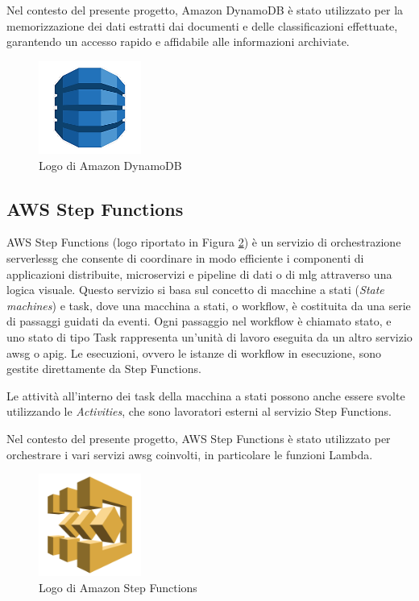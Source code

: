 Nel contesto del presente progetto, Amazon DynamoDB è stato utilizzato per la memorizzazione dei dati estratti dai documenti e delle classificazioni effettuate, garantendo un accesso rapido e affidabile alle informazioni archiviate.



\begin{figure}[h]
  \centering
  \includegraphics[width=0.3\textwidth]{img/tecnologie/DynamoDB.png}
  \caption{Logo di Amazon DynamoDB}
  \label{fig:dynamodb}
\end{figure}
\subsection{AWS Step Functions}
AWS Step Functions (logo riportato in Figura \ref{fig:stepfunctions}) è un servizio di orchestrazione \gls{serverlessg} che consente di coordinare in modo efficiente i componenti di applicazioni distribuite, microservizi e pipeline di dati o di \gls{mlg} attraverso una logica visuale. Questo servizio si basa sul concetto di macchine a stati (\textit{State machines}) e task, dove una macchina a stati, o workflow, è costituita da una serie di passaggi guidati da eventi. Ogni passaggio nel workflow è chiamato stato, e uno stato di tipo Task rappresenta un'unità di lavoro eseguita da un altro servizio \gls{awsg} o \gls{apig}. Le esecuzioni, ovvero le istanze di workflow in esecuzione, sono gestite direttamente da Step Functions.

Le attività all'interno dei task della macchina a stati possono anche essere svolte utilizzando le \textit{Activities}, che sono lavoratori esterni al servizio Step Functions.

Nel contesto del presente progetto, AWS Step Functions è stato utilizzato per orchestrare i vari servizi \gls{awsg} coinvolti, in particolare le funzioni Lambda. 


\begin{figure}[h]
  \centering
  \includegraphics[width=0.3\textwidth]{img/tecnologie/stepfunctions.png}
  \caption{Logo di Amazon Step Functions}
  \label{fig:stepfunctions}
\end{figure}

